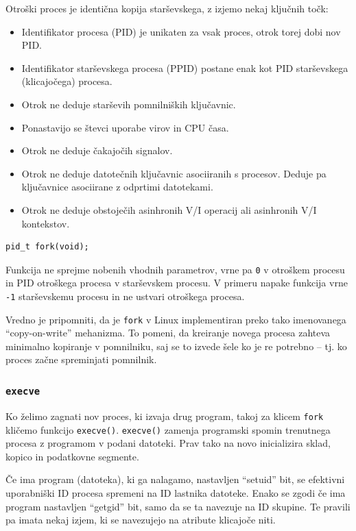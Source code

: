 \documentclass[a4paper,12pt,openright]{book}
\begin{document}
Otroški proces je identična kopija starševskega, z izjemo nekaj ključnih točk:
\begin{itemize}
	\item Identifikator procesa (PID) je unikaten za vsak proces, otrok torej dobi nov PID.
	\item Identifikator starševskega procesa (PPID) postane enak kot PID starševskega (klicajočega) procesa.
	\item Otrok ne deduje starševih pomnilniških ključavnic.
	\item Ponastavijo se števci uporabe virov in CPU časa.
	\item Otrok ne deduje čakajočih signalov.
	\item Otrok ne deduje datotečnih ključavnic asociiranih s procesov. Deduje pa ključavnice asociirane z odprtimi datotekami.
	\item Otrok ne deduje obstoječih asinhronih V/I operacij ali asinhronih V/I kontekstov.
\end{itemize}

\begin{lstlisting}[style=func]
 pid_t fork(void);
\end{lstlisting}

Funkcija ne sprejme nobenih vhodnih parametrov, vrne pa \texttt{0} v otroškem procesu in PID otroškega procesa v starševskem procesu.
V primeru napake funkcija vrne \texttt{-1} starševskemu procesu in ne ustvari otroškega procesa.

Vredno je pripomniti, da je \texttt{fork} v Linux implementiran preko tako imenovanega ``copy-on-write'' mehanizma.
To pomeni, da kreiranje novega procesa zahteva minimalno kopiranje v pomnilniku, saj se to izvede šele ko je re potrebno -- tj. ko proces začne spreminjati pomnilnik.

\subsubsection{\texttt{execve}}

Ko želimo zagnati nov proces, ki izvaja drug program, takoj za klicem \texttt{fork} kličemo funkcijo \texttt{execve()}.
\texttt{execve()} zamenja programski spomin trenutnega procesa z programom v podani datoteki.
Prav tako na novo inicializira sklad, kopico in podatkovne segmente.

Če ima program (datoteka), ki ga nalagamo, nastavljen ``setuid'' bit, se efektivni uporabniški ID procesa spremeni na ID lastnika datoteke.
Enako se zgodi če ima program nastavljen ``getgid'' bit, samo da se ta navezuje na ID skupine.
Te pravili pa imata nekaj izjem, ki se navezujejo na atribute klicajoče niti.
\end{document}
